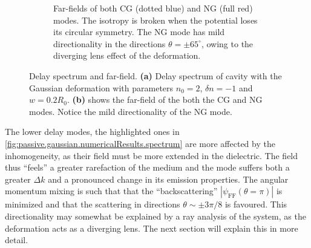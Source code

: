 \begin{figure}
\begin{subfigure}{0.39\textwidth}
  \caption{Far-fields of both CG (dotted blue) and NG (full red) modes. The isotropy is broken 
	  when the potential loses its circular symmetry. The NG mode has mild directionality
	  in the directions $\theta=\pm65^\circ$, owing to the diverging lens effect of the deformation.}
  \label{fig:passive.gaussian.numericalResults.farField}
 \end{subfigure}
 \caption[Delay spectrum of the Gaussian cavity and the far-fields of two chosen modes]
	  {Delay spectrum and far-field. \textbf{(a)}
	  Delay spectrum of cavity with the Gaussian deformation with parameters $n_0=2$, $\delta n=-1$ and $w=0.2R_0$.
	  \textbf{(b)} shows the far-field of the both the CG and NG modes.
	  Notice the mild directionality of the NG mode.}
 \label{fig:passive.gaussian.numericalResults}
\end{figure}

The lower delay modes, the highlighted ones in \ref{fig:passive.gaussian.numericalResults.spectrum}
are more affected by the inhomogeneity, as their field must be more
extended in the dielectric. The field thus ``feels'' a greater
rarefaction of the medium and the mode suffers both a greater $\Delta k$
and a pronounced change in its emission properties. The angular momentum
mixing is such that that the ``backscattering'' $|\psi_\text{FF}(\theta=\pi)|$
is minimized and that the scattering in directions $\theta\sim\pm3\pi/8$
is favoured. This directionality may somewhat be explained by a
ray analysis of the system, as the deformation acts as a diverging
lens. The next section will explain this in more detail. 

